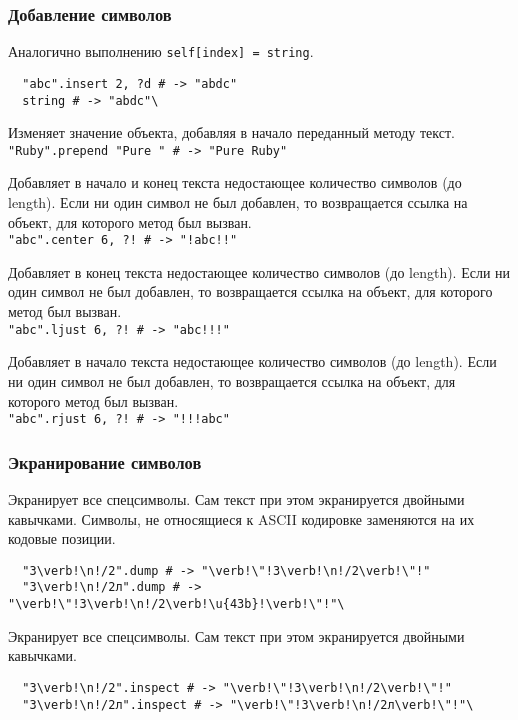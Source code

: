 \subsubsection*{Добавление символов}

\begin{methodlist}
  Аналогично выполнению \verb!self[index] = string!.
  \begin{verbatim}
  "abc".insert 2, ?d # -> "abdc"
  string # -> "abdc"\
  \end{verbatim}

  Изменяет значение объекта, добавляя в начало переданный методу текст.
  \\\verb!"Ruby".prepend "Pure " # -> "Pure Ruby"!

  Добавляет в начало и конец текста недостающее количество символов (до length). Если ни один символ не был добавлен, то возвращается ссылка на объект, для которого метод был вызван.
  \\\verb|"abc".center 6, ?! # -> "!abc!!"|

  Добавляет в конец текста недостающее количество символов (до length). Если ни один символ не был добавлен, то возвращается ссылка на объект, для которого метод был вызван.
  \\\verb|"abc".ljust 6, ?! # -> "abc!!!"|

  Добавляет в начало текста недостающее количество символов (до length). Если ни один символ не был добавлен, то возвращается ссылка на объект, для которого метод был вызван.
  \\\verb|"abc".rjust 6, ?! # -> "!!!abc"|
\end{methodlist}

\subsubsection*{Экранирование символов}

\begin{methodlist}
  Экранирует все спецсимволы. Сам текст при этом экранируется двойными кавычками. Символы, не относящиеся к ASCII кодировке заменяются на их кодовые позиции.
  \begin{verbatim}
  "3\verb!\n!/2".dump # -> "\verb!\"!3\verb!\n!/2\verb!\"!"
  "3\verb!\n!/2л".dump # -> "\verb!\"!3\verb!\n!/2\verb!\u{43b}!\verb!\"!"\
  \end{verbatim}

  Экранирует все спецсимволы. Сам текст при этом экранируется двойными кавычками.
  \begin{verbatim}
  "3\verb!\n!/2".inspect # -> "\verb!\"!3\verb!\n!/2\verb!\"!"
  "3\verb!\n!/2л".inspect # -> "\verb!\"!3\verb!\n!/2л\verb!\"!"\
  \end{verbatim}
\end{methodlist}

